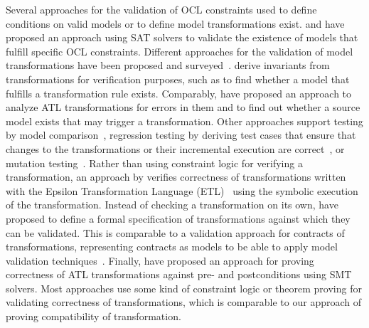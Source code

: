 Several approaches for the validation of \gls{OCL} constraints used to define conditions on valid models or to define model transformations exist.
\textcite{kuhlmann2011a} and \textcite{gonzalez2012a} have proposed an approach using SAT solvers to validate the existence of models that fulfill specific \gls{OCL} constraints.
Different approaches for the validation of model transformations have been proposed and surveyed~\cite{calegari2013verificationTransformations-ENTCS,rahim2015SurveyTransformationVerification-SoSym}.
\textcite{cabot2010VerificationInvariants-JSS} derive invariants from transformations for verification purposes, such as to find whether a model that fulfills a transformation rule exists.
Comparably, \textcite{cuadrado2017tse} have proposed an approach to analyze \gls{ATL} transformations for errors in them and to find out whether a source model exists that may trigger a transformation.
Other approaches support testing by model comparison~\cite{kolovos2006transformationTesting-WGIMM}, regression testing by deriving test cases that ensure that changes to the transformations or their incremental execution are correct~\cite{troy2018inferenceTransformations-JSS}, or mutation testing~\cite{troya2015imutationTestingTransformations-ICSTW}.
Rather than using constraint logic for verifying a transformation, an approach by \textcite{azizi2017ContractVerification-ICCKE} verifies correctness of transformations written with the Epsilon Transformation Language (ETL)~\cite{kolovos2014epsilon-Book} using the symbolic execution of the transformation.
Instead of checking a transformation on its own, \textcite{vallecillo2012FormalTesting-FMMDE} have proposed to define a formal specification of transformations against which they can be validated.
This is comparable to a validation approach for contracts of transformations, representing contracts as models to be able to apply model validation techniques~\cite{braga2014consistencyTransformations-SCP}.
Finally, \textcite{buettner2012models} have proposed an approach for proving correctness of \gls{ATL} transformations against pre- and postconditions using \gls{SMT} solvers.
Most approaches use some kind of constraint logic or theorem proving for validating correctness of transformations, which is comparable to our approach of proving compatibility of transformation.

